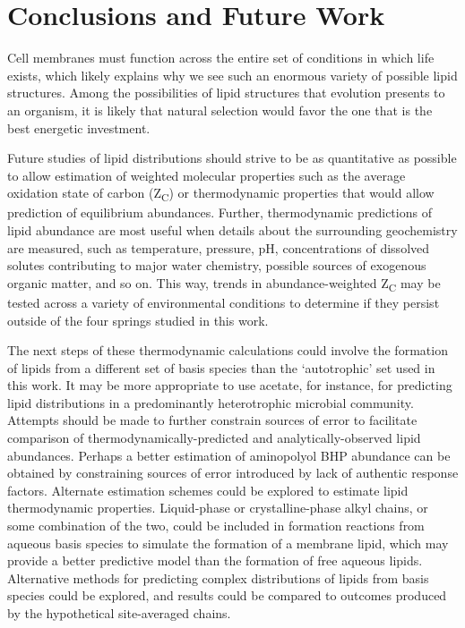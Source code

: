 \chapter{Conclusions and Future Work}

Cell membranes must function across the entire set of conditions in which life exists, which likely explains why we see such an enormous variety of possible lipid structures. Among the possibilities of lipid structures that evolution presents to an organism, it is likely that natural selection would favor the one that is the best energetic investment.

Future studies of lipid distributions should strive to be as quantitative as possible to allow estimation of weighted molecular properties such as the average oxidation state of carbon (Z\textsubscript{C}) or thermodynamic properties that would allow prediction of equilibrium abundances. Further, thermodynamic predictions of lipid abundance are most useful when details about the surrounding geochemistry are measured, such as temperature, pressure, pH, concentrations of dissolved solutes contributing to major water chemistry, possible sources of exogenous organic matter, and so on. This way, trends in abundance-weighted Z\textsubscript{C} may be tested across a variety of environmental conditions to determine if they persist outside of the four springs studied in this work.

The next steps of these thermodynamic calculations could involve the formation of lipids from a different set of basis species than the `autotrophic' set used in this work. It may be more appropriate to use acetate, for instance, for predicting lipid distributions in a predominantly heterotrophic microbial community. Attempts should be made to further constrain sources of error to facilitate comparison of thermodynamically-predicted and analytically-observed lipid abundances. Perhaps a better estimation of aminopolyol BHP abundance can be obtained by constraining sources of error introduced by lack of authentic response factors. Alternate estimation schemes could be explored to estimate lipid thermodynamic properties. Liquid-phase or crystalline-phase alkyl chains, or some combination of the two, could be included in formation reactions from aqueous basis species to simulate the formation of a membrane lipid, which may provide a better predictive model than the formation of free aqueous lipids. Alternative methods for predicting complex distributions of lipids from basis species could be explored, and results could be compared to outcomes produced by the hypothetical site-averaged chains.

